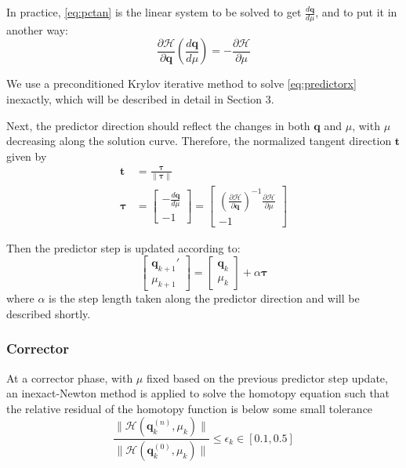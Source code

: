 \documentclass{article}
\theoremstyle{definition}
\begin{document}
In practice, \eqref{eq:pctan} is the linear system to be solved to get $\frac{d \boldsymbol{q} }{d \mu} $, and to put it in another way: 
\begin{equation}\label{eq:predictorx}
\frac{\partial \mathcal{H}}{\partial \boldsymbol{q}} \left( \frac{d \boldsymbol{q} }{d \mu}\right) = -\frac{\partial \mathcal{H}}{\partial \mu}
\end{equation}

We use a preconditioned Krylov iterative method to solve \eqref{eq:predictorx} inexactly, which will be described in detail in Section 3. 

Next, the predictor direction should reflect the changes in both $\boldsymbol{q}$ and $\mu$, with $\mu$ decreasing along the solution curve. Therefore, the normalized tangent direction $\boldsymbol{t}$ given by 
\begin{equation}
\begin{aligned}
\boldsymbol{t} &= \frac{\boldsymbol{\tau}}{\lVert \boldsymbol{\tau}\rVert } \\
\boldsymbol{\tau} &= \begin{bmatrix}
-\frac{d \boldsymbol{q} }{d \mu} \\ -1 
\end{bmatrix} 
= \begin{bmatrix}
\left( \frac{\partial \mathcal{H}}{\partial \boldsymbol{q}}\right)^{-1} \frac{\partial \mathcal{H}}{\partial \mu} \\
-1 
\end{bmatrix} 
\end{aligned}
\end{equation}

Then the predictor step is updated according to:
\begin{equation}\label{eq:pred}
\begin{bmatrix}
\boldsymbol{q}_{k+1}' \\ \mu_{k+1} 
\end{bmatrix} 
=\begin{bmatrix}
\boldsymbol{q}_k \\ \mu_k 
\end{bmatrix} 
+ \alpha \boldsymbol{\tau}
\end{equation}
where $\alpha$ is the step length taken along the predictor direction and will be described shortly.  

\subsubsection{Corrector}
At a corrector phase, with $\mu$ fixed based on the previous predictor step update, an inexact-Newton method is applied to solve the homotopy equation such that the relative residual of the homotopy function is below some small tolerance
\begin{equation}\label{eq:cornt}
\frac{\lVert \mathcal{H}\left(\boldsymbol{q}_k^{(n)}, \mu_k \right) \rVert}{\lVert \mathcal{H}\left(\boldsymbol{q}_k^{(0)}, \mu_k \right) \rVert} \leq \epsilon_k \in [0.1, 0.5]
\end{equation}
\end{document}
